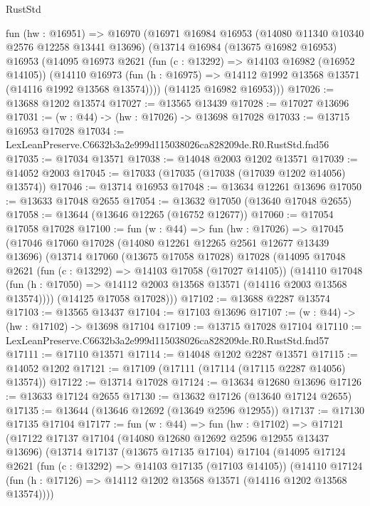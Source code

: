 \begin{lexlean}{RustStd}
\begin{coremodule}
  fun (hw : @16951) =>
  @16970
    (@16971
      @16984
      @16953
      (@14080 @11340 @10340 @2576 @12258 @13441 @13696)
      (@13714
        @16984
        (@13675 @16982 @16953)
        @16953
        (@14095
          @16973
          @2621
          (fun (c : @13292) => @14103 @16982 (@16952 @14105))
          (@14110
            @16973
            (fun (h : @16975) => @14112 @1992 @13568 @13571 (@14116 @1992 @13568 @13574))))
        (@14125 @16982 @16953)))
@17026 := @13688 @1202 @13574
@17027 := @13565 @13439
@17028 := @17027 @13696
@17031 := (w : @44) -> (hw : @17026) -> @13698 @17028
@17033 := @13715 @16953 @17028
@17034 := LexLeanPreserve.C6632b3a2e999d115038026ca828209de.R0.RustStd.fnd56
@17035 := @17034 @13571
@17038 := @14048 @2003 @1202 @13571
@17039 := @14052 @2003
@17045 := @17033 (@17035 (@17038 (@17039 @1202 @14056) @13574))
@17046 := @13714 @16953
@17048 := @13634 @12261 @13696
@17050 := @13633 @17048 @2655
@17054 := @13632 @17050 (@13640 @17048 @2655)
@17058 := @13644 (@13646 @12265 (@16752 @12677))
@17060 := @17054 @17058 @17028
@17100 := fun (w : @44) =>
  fun (hw : @17026) =>
  @17045
    (@17046
      @17060
      @17028
      (@14080 @12261 @12265 @2561 @12677 @13439 @13696)
      (@13714
        @17060
        (@13675 @17058 @17028)
        @17028
        (@14095
          @17048
          @2621
          (fun (c : @13292) => @14103 @17058 (@17027 @14105))
          (@14110
            @17048
            (fun (h : @17050) => @14112 @2003 @13568 @13571 (@14116 @2003 @13568 @13574))))
        (@14125 @17058 @17028)))
@17102 := @13688 @2287 @13574
@17103 := @13565 @13437
@17104 := @17103 @13696
@17107 := (w : @44) -> (hw : @17102) -> @13698 @17104
@17109 := @13715 @17028 @17104
@17110 := LexLeanPreserve.C6632b3a2e999d115038026ca828209de.R0.RustStd.fnd57
@17111 := @17110 @13571
@17114 := @14048 @1202 @2287 @13571
@17115 := @14052 @1202
@17121 := @17109 (@17111 (@17114 (@17115 @2287 @14056) @13574))
@17122 := @13714 @17028
@17124 := @13634 @12680 @13696
@17126 := @13633 @17124 @2655
@17130 := @13632 @17126 (@13640 @17124 @2655)
@17135 := @13644 (@13646 @12692 (@13649 @2596 @12955))
@17137 := @17130 @17135 @17104
@17177 := fun (w : @44) =>
  fun (hw : @17102) =>
  @17121
    (@17122
      @17137
      @17104
      (@14080 @12680 @12692 @2596 @12955 @13437 @13696)
      (@13714
        @17137
        (@13675 @17135 @17104)
        @17104
        (@14095
          @17124
          @2621
          (fun (c : @13292) => @14103 @17135 (@17103 @14105))
          (@14110
            @17124
            (fun (h : @17126) => @14112 @1202 @13568 @13571 (@14116 @1202 @13568 @13574))))

\end{coremodule}
\end{lexlean}
